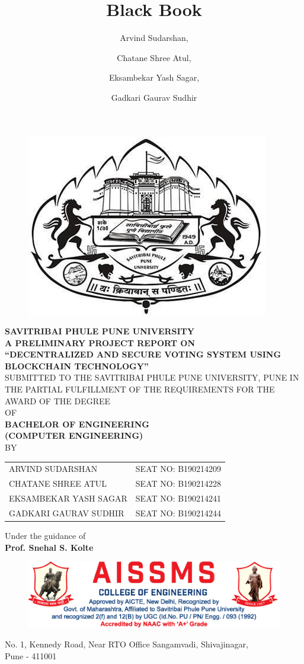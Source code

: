 \documentclass[oneside, 12pt]{book}
\title{Black Book}
\author{
  Arvind Sudarshan,
  \and
  Chatane Shree Atul,
  \and
  Eksambekar Yash Sagar,
  \and
  Gadkari Gaurav Sudhir
}
\begin{document}
	\pagestyle{plain}
	\renewcommand{\headrulewidth}{0pt}
	\titleformat{\chapter}[display]{\bfseries\centering}{\chaptertitlename}{20pt}{\Large\uppercase}

	\frontmatter

	\begin{titlepage}
		\centering
		\begin{figure}[H]
			\centering
			\includegraphics[width=0.4\linewidth]{./Resources/sppu.png}
		\end{figure}
		\textbf{SAVITRIBAI PHULE PUNE UNIVERSITY}\break
		\\\textbf{A PRELIMINARY PROJECT REPORT ON}\break
		\\{\large\textbf{“DECENTRALIZED AND SECURE VOTING SYSTEM USING BLOCKCHAIN TECHNOLOGY”}}\break
		\\SUBMITTED TO THE SAVITRIBAI PHULE PUNE UNIVERSITY, PUNE IN THE PARTIAL FULFILLMENT OF THE REQUIREMENTS FOR THE AWARD OF THE DEGREE\break
		\\OF\break
		\\{\large\textbf{BACHELOR OF ENGINEERING\\(COMPUTER ENGINEERING)}}\break
		\\BY\break
		\begin{table}[H]
			\centering
			\begin{tabular}{lr}
				ARVIND SUDARSHAN      & SEAT NO: B190214209 \\
				CHATANE SHREE ATUL    & SEAT NO: B190214228 \\
				EKSAMBEKAR YASH SAGAR & SEAT NO: B190214241 \\
				GADKARI GAURAV SUDHIR & SEAT NO: B190214244
			\end{tabular}
		\end{table}
		Under the guidance of\break
		\\\textbf{Prof. Snehal S. Kolte}\break
		\begin{figure}[H]
			\centering
			\includegraphics[width=\linewidth]{./Resources/letterhead2.png}
		\end{figure}
		No. 1, Kennedy Road, Near RTO Office Sangamvadi, Shivajinagar,\\Pune - 411001
		\restoregeometry
	\end{titlepage}
	
\end{document}
